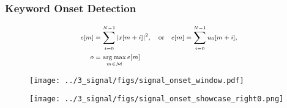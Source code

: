 \begin{frame}
  \frametitle{Keyword Onset Detection}
  \vspace{-1cm}
  \begin{equation*}
  \scriptsize
    \begin{aligned}
      e[m] &= \sum_{i=0}^{N-1} \abs{x[m + i]}^2, \quad \mathrm{or} \quad e[m] = \sum_{i=0}^{N-1} u_0[m + i],\\
      o &= \underset{m \in \mathcal{M}}{\arg \max} \, e[m]
    \end{aligned}
  \end{equation*}
  \begin{figure} \hspace{0.75cm} \texttt{[image: ../3\_signal/figs/signal\_onset\_window.pdf]} \end{figure}
  \begin{figure} \texttt{[image: ../3\_signal/figs/signal\_onset\_showcase\_right0.png]} \end{figure}
\end{frame}